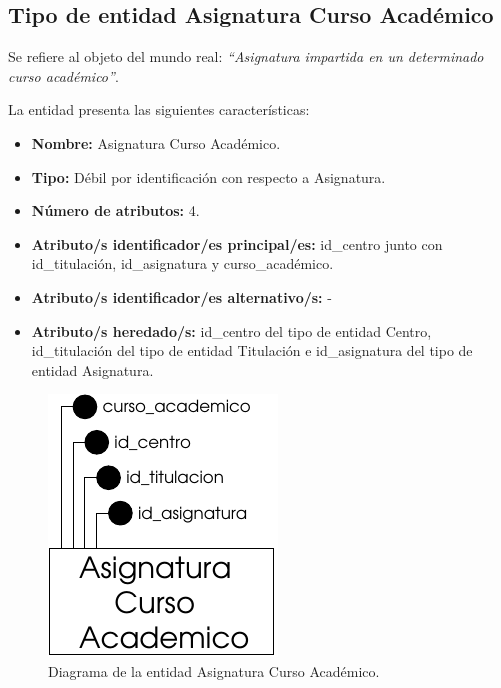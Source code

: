 \subsection{Tipo de entidad Asignatura Curso Académico}

   \begin{description}

   \item[Definición] Se refiere al objeto del mundo real: \emph{``Asignatura
   impartida en un determinado curso académico''}.

   \item[Características] La entidad presenta las siguientes características:
      \begin{itemize}
         \item \textbf{Nombre:} Asignatura Curso Académico.
         \item \textbf{Tipo:} Débil por identificación con respecto a Asignatura.
         \item \textbf{Número de atributos:} 4.
         \item \textbf{Atributo/s identificador/es principal/es:} id\_centro junto con \\id\_titulación, id\_asignatura y curso\_académico.
         \item \textbf{Atributo/s identificador/es alternativo/s:} -
         \item \textbf{Atributo/s heredado/s:} id\_centro del tipo de entidad Centro, \\id\_titulación del tipo de entidad Titulación e id\_asignatura del tipo de entidad Asignatura.
      \end{itemize}

   \item[Diagrama]
   \item \begin{figure}[h!]
            \begin{center}
            \includegraphics[]{07.Modelo_Entidad-Interrelacion/7.2.Analisis_Entidades/diagramas/aca.pdf}
            \caption{Diagrama de la entidad Asignatura Curso Académico.}
            \end{center}
         \end{figure}


\end{description}
